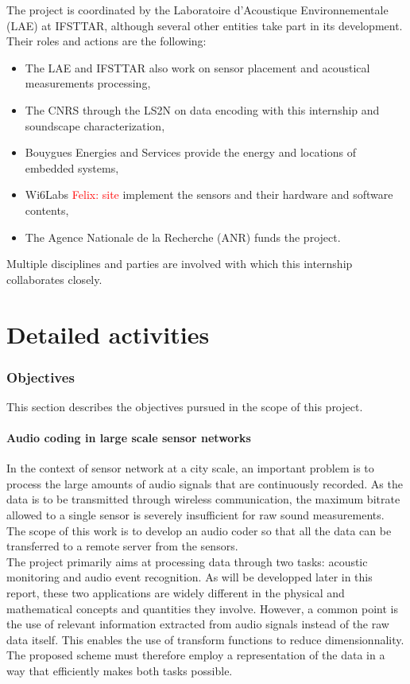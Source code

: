 \documentclass[12pt,times,onecolumn]{article}
\newcommand{\fg}[1]{\textcolor{red}{ Felix: #1}}
\begin{document}
The project is coordinated by the Laboratoire d'Acoustique Environnementale (LAE) at IFSTTAR, although several other entities take part in its development. Their roles and actions are the following:
\begin{itemize}
\item The LAE and IFSTTAR also work on sensor placement and acoustical measurements processing,
\item The CNRS through the LS2N on data encoding with this internship and soundscape characterization,
\item Bouygues Energies and Services provide the energy and locations of embedded systems,
\item Wi6Labs \fg{site} implement the sensors and their hardware and software contents,
\item The Agence Nationale de la Recherche (ANR) funds the project.
\end{itemize}
Multiple disciplines and parties are involved with which this internship collaborates closely. 





\clearpage

\part{Detailed activities}
\setcounter{section}{0}
\section{Objectives}
This section describes the objectives pursued in the scope of this project.
\subsection{Audio coding in large scale sensor networks}
In the context of sensor network at a city scale, an important problem is to process the large amounts of audio signals that are continuously recorded. As the data is to be transmitted through wireless communication, the maximum bitrate allowed to a single sensor is severely insufficient for raw sound measurements. The scope of this work is to develop an audio coder so that all the data can be transferred to a remote server from the sensors.\\

The project primarily aims at processing data through two tasks: acoustic monitoring and audio event recognition. As will be developped later in this report, these two applications are widely different in the physical and mathematical concepts and quantities they involve. However, a common point is the use of relevant information extracted from audio signals instead of the raw data itself. This enables the use of transform functions to reduce dimensionnality. The proposed scheme must therefore employ a representation of the data in a way that efficiently makes both tasks possible.\\
\end{document}
